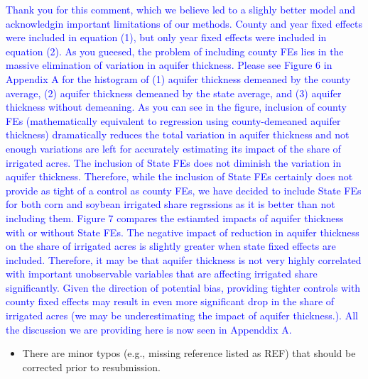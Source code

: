 \documentclass[
]{article}
\providecommand{\tightlist}{%
  \setlength{\itemsep}{0pt}\setlength{\parskip}{0pt}}
\begin{document}
\textcolor{blue}{Thank you for this comment, which we believe led to a slighly better model and acknowledgin important limitations of our methods. County and year fixed effects were included in equation (1), but only year fixed effects were included in equation (2). As you gueesed, the problem of including county FEs lies in the massive elimination of variation in aquifer thickness. Please see Figure 6 in Appendix A for the histogram of (1) aquifer thickness demeaned by the county average, (2) aquifer thickness demeaned by the state average, and (3) aquifer thickness without demeaning. As you can see in the figure, inclusion of county FEs (mathematically equivalent to regression using county-demeaned aquifer thickness) dramatically reduces the total variation in aquifer thickness and not enough variations are left for accurately estimating its impact of the share of irrigated acres. The inclusion of State FEs does not diminish the variation in aquifer thickness. Therefore, while the inclusion of State FEs certainly does not provide as tight of a control as county FEs, we have decided to include State FEs for both corn and soybean irrigated share regrssions as it is better than not including them. Figure 7 compares the estiamted impacts of aquifer thickness with or without State FEs. The negative impact of reduction in aquifer thickness on the share of irrigated acres is slightly greater when state fixed effects are included. Therefore, it may be that aquifer thickness is not very highly correlated with important unobservable variables that are affecting irrigated share significantly. Given the direction of potential bias, providing tighter controls with county fixed effects may result in even more significant drop in the share of irrigated acres (we may be underestimating the impact of aquifer thickness.). All the discussion we are providing here is now seen in Appenddix A.
}

\begin{itemize}
\tightlist
\item
  There are minor typos (e.g., missing reference listed as REF) that
  should be corrected prior to resubmission.
\end{itemize}

\textcolor{blue}{}
\end{document}
